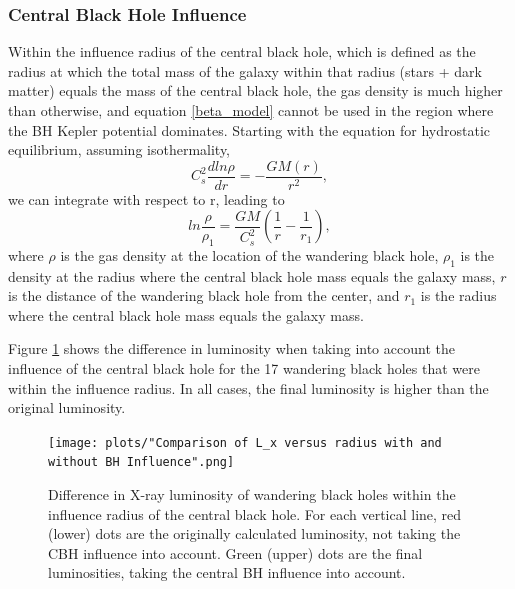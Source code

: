 \documentclass[fleqn,usenatbib,useAMS]{mnras}
\begin{document}
\subsubsection{Central Black Hole Influence}
Within the influence radius of the central black hole, which is defined as the radius at which the total mass of the galaxy within that radius (stars + dark matter) equals the mass of the central black hole, the gas density is much higher than otherwise, and equation \eqref{beta_model} cannot be used in the region where the BH Kepler potential dominates.  Starting with the equation for hydrostatic equilibrium, assuming isothermality,
\begin{equation}
    C_{s}^2\frac{dln\rho}{dr}= -\frac{GM(r)}{r^2},
\end{equation}
we can integrate with respect to r, leading to 
\begin{equation}
    ln\frac{\rho}{\rho_1} = \frac{GM}{C_{s}^2}\left(\frac{1}{r} - \frac{1}{r_1}\right),
\end{equation}
where $\rho$ is the gas density at the location of the wandering black hole, $\rho_1$ is the density at the radius where the central black hole mass equals the galaxy mass, $r$ is the distance of the wandering black hole from the center, and $r_1$ is the radius where the central black hole mass equals the galaxy mass.

Figure \ref{fig:wui} shows the difference in luminosity when taking into account the influence of the central black hole for the 17 wandering black holes that were within the influence radius.  In all cases, the final luminosity is higher than the original luminosity.
\begin{figure}
\begin{center}
\texttt{[image: plots/"Comparison of L\_x versus radius with and without BH Influence".png]}
\caption{Difference in X-ray luminosity of wandering black holes within the influence radius of the central black hole.  For each vertical line, red (lower) dots are the originally calculated luminosity, not taking the CBH influence into account.  Green (upper) dots are the final luminosities, taking the central BH influence into account.}
\label{fig:wui}
\end{center}
\end{figure}
\end{document}
